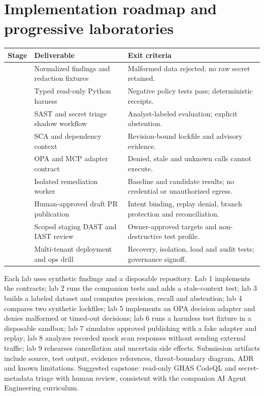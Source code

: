 \documentclass[11pt,letterpaper]{article}
\begin{document}
\section{Implementation roadmap and progressive laboratories}
\begin{longtable}{@{}>{\raggedright\arraybackslash}p{.12\linewidth}>{\raggedright\arraybackslash}p{.39\linewidth}>{\raggedright\arraybackslash}p{.41\linewidth}@{}}
\toprule Stage & Deliverable & Exit criteria\\\midrule\endhead
1 & Normalized findings and redaction fixtures & Malformed data rejected; no raw secret retained.\\
2 & Typed read-only Python harness & Negative policy tests pass; deterministic receipts.\\
3 & SAST and secret triage shadow workflow & Analyst-labeled evaluation; explicit abstention.\\
4 & SCA and dependency context & Revision-bound lockfile and advisory evidence.\\
5 & OPA and MCP adapter contract & Denied, stale and unknown calls cannot execute.\\
6 & Isolated remediation worker & Baseline and candidate results; no credential or unauthorized egress.\\
7 & Human-approved draft PR publication & Intent binding, replay denial, branch protection and reconciliation.\\
8 & Scoped staging DAST and IAST review & Owner-approved targets and non-destructive test profile.\\
9 & Multi-tenant deployment and ops drill & Recovery, isolation, load and audit tests; governance signoff.\\
\bottomrule
\end{longtable}
Each lab uses synthetic findings and a disposable repository. Lab 1 implements the contracts; lab 2 runs the companion tests and adds a stale-context test; lab 3 builds a labeled dataset and computes precision, recall and abstention; lab 4 compares two synthetic lockfiles; lab 5 implements an OPA decision adapter and denies malformed or timed-out decisions; lab 6 runs a harmless test fixture in a disposable sandbox; lab 7 simulates approved publishing with a fake adapter and replay; lab 8 analyzes recorded mock scan responses without sending external traffic; lab 9 rehearses cancellation and uncertain side effects. Submission artifacts include source, test output, evidence references, threat-boundary diagram, ADR and known limitations. Suggested capstone: read-only GHAS CodeQL and secret-metadata triage with human review, consistent with the companion AI Agent Engineering curriculum.
\end{document}
